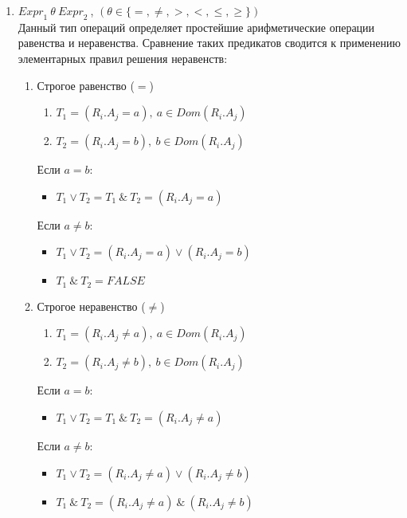 \documentclass[10pt,a4paper]{article}
\def \n #1{\mathit{#1}}
\begin{document}
\begin{enumerate}
\item $ \n{Expr}_1\ \theta\ \n{Expr}_2\ $, $(\theta \in \{=, \neq, >, <, \leq, \geq\})$\\
Данный тип операций определяет простейшие арифметические операции равенства и неравенства. Сравнение
таких предикатов сводится к применению элементарных правил решения неравенств:
\begin{enumerate}[label=\Roman*]
  \item Строгое равенство ($=$)
  \begin{enumerate}[label=\arabic*:]
    \item $T_1 = (R_i.A_j = a),\ a \in Dom(R_i.A_j)$
    \item $T_2 = (R_i.A_j = b),\ b \in Dom(R_i.A_j)$
  \end{enumerate}
  Если $a = b$:  
  \begin{itemize}
    \item $T_1 \vee T_2 = T_1\ \&\ T_2 = (R_i.A_j = a)$
  \end{itemize}
  Если $a \neq b$:
  \begin{itemize}
    \item $T_1 \vee T_2 = (R_i.A_j = a) \vee (R_i.A_j = b)$
    \item $T_1\ \&\ T_2 = \n{FALSE}$
  \end{itemize}

  \item Строгое неравенство ($\neq$)
  \begin{enumerate}[label=\arabic*:]
    \item $T_1 = (R_i.A_j \neq a),\ a \in Dom(R_i.A_j)$
    \item $T_2 = (R_i.A_j \neq b),\ b \in Dom(R_i.A_j)$
  \end{enumerate}
  Если $a = b$:
  \begin{itemize}
    \item $T_1 \vee T_2 = T_1\ \&\ T_2 = (R_i.A_j \neq a)$
  \end{itemize}
  Если $a \neq b$:
  \begin{itemize}
    \item $T_1 \vee T_2 = (R_i.A_j \neq a) \vee (R_i.A_j \neq b)$
    \item $T_1\ \&\ T_2 = (R_i.A_j \neq a)\ \&\ (R_i.A_j \neq b)$
  \end{itemize}


\end{enumerate}
\end{enumerate}
\end{document}
